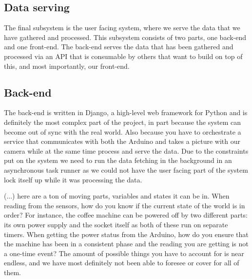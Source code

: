 \documentclass[12pt,a4paper,oneside,article]{memoir}
\numberwithin{equation}{chapter}
\begin{document}
\subsection{Data serving}\label{sec:data-serving}
The final subsystem is the user facing system, where we serve the data that we 
have gathered and processed. This subsystem consists of two parts, one back-end 
and one front-end. The back-end serves the data that has been gathered and 
processed via an API that is consumable by others that want to build on top of 
this, and most importantly, our front-end.

\subsection{Back-end}\label{sec:back-end}
The back-end is written in Django, a high-level web framework for Python and is
definitely the most complex part of the project, in part because the system can 
become out of sync with the real world. Also because you have to orchestrate a 
service that communicates with both the Arduino and takes a picture with our 
camera while at the same time process and serve the data. Due to the constraints 
put on the system we need to run the data fetching in the background in an 
asynchronous task runner as we could not have the user facing part of the system 
lock itself up while it was processing the data.

(...) here are a ton of moving parts, variables and states it can be in. When 
reading from the sensors, how do you know if the current state of the world is 
in order? For instance, the coffee machine can be powered off by two different 
parts: its own power supply and the socket itself as both of these run on 
separate timers. When getting the power status from the Arduino, how do you 
ensure that the machine has been in a consistent phase and the reading you are 
getting is not a one-time event? The amount of possible things you have to 
account for is near endless, and we have most definitely not been able to 
foresee or cover for all of them.
\end{document}
